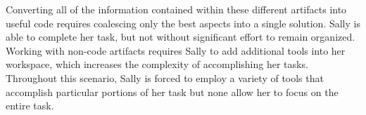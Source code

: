\documentclass{ppig}
\begin{document}
Converting all of the information contained within these different artifacts into useful code requires coalescing only the best aspects into a single solution.
Sally is able to complete her task, but not without significant effort to remain organized.
Working with non-code artifacts requires Sally to add additional tools into her workspace, which increases the complexity of accomplishing her tasks.
Throughout this scenario, Sally is forced to employ a variety of tools that accomplish particular portions of her task but none allow her to focus on the entire task.


 
\end{document}
